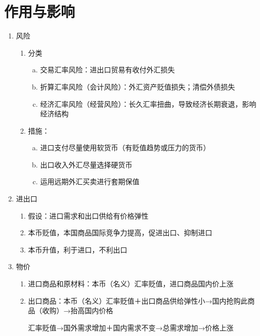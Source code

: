 \documentclass[12pt]{book}
\begin{document}
\section{作用与影响}



\begin{enumerate}[1.]
    \item 风险
          \begin{enumerate}[(1)]
              \item 分类
                    \begin{enumerate}[a.]
                        \item 交易汇率风险：进出口贸易有收付外汇损失
                        \item 折算汇率风险（会计风险）：外汇资产贬值损失；清偿外债损失
                        \item 经济汇率风险（经营风险）：长久汇率扭曲，导致经济长期衰退，影响经济结构
                    \end{enumerate}
              \item 措施：
                    \begin{enumerate}[a.]
                        \item 进口支付尽量使用软货币（有贬值趋势或压力的货币）
                        \item 出口收入外汇尽量选择硬货币
                        \item 运用远期外汇买卖进行套期保值
                    \end{enumerate}
          \end{enumerate}
    \item 进出口
          \begin{enumerate}[(1)]
              \item 假设：进口需求和出口供给有价格弹性
              \item 本币贬值，本国商品国际竞争力提高，促进出口、抑制进口
              \item 本币升值，利于进口，不利出口
          \end{enumerate}
    \item 物价
          \begin{enumerate}[(1)]
              \item 进口商品和原材料：本币（名义）汇率贬值，进口商品国内价上涨
              \item 出口商品：本币（名义）汇率贬值＋出口商品供给弹性小→国内抢购此商品（收购）→抬高国内价格
                    \par 汇率贬值→国外需求增加＋国内需求不变→总需求增加→价格上涨

\end{enumerate}
\end{enumerate}
\end{document}
